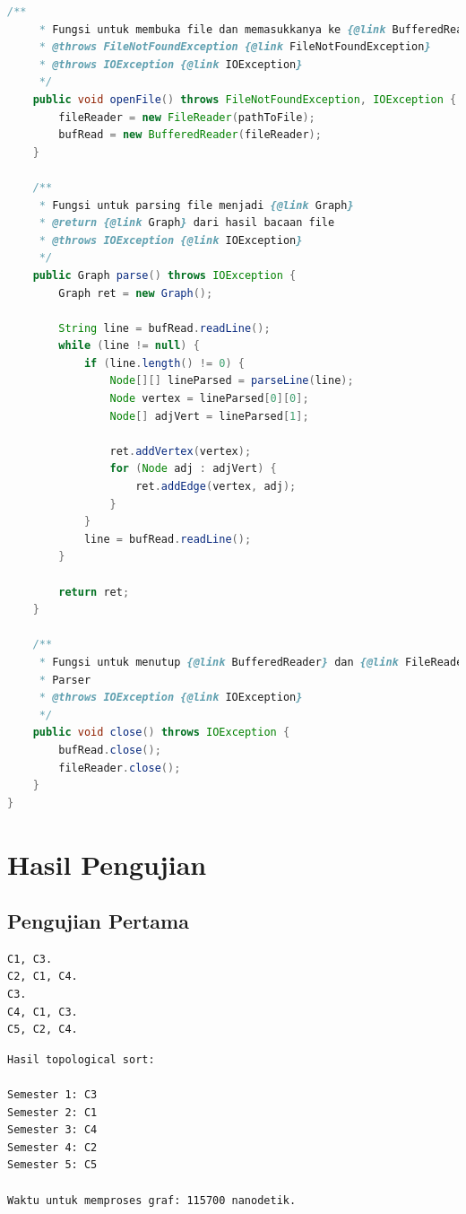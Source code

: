 \documentclass{article}
\begin{document}
\begin{lstlisting}[caption = lib/Parser.java, language = java]
    /**
     * Fungsi untuk membuka file dan memasukkanya ke {@link BufferedReader}
     * @throws FileNotFoundException {@link FileNotFoundException}
     * @throws IOException {@link IOException}
     */
    public void openFile() throws FileNotFoundException, IOException {
        fileReader = new FileReader(pathToFile);
        bufRead = new BufferedReader(fileReader);
    }

    /**
     * Fungsi untuk parsing file menjadi {@link Graph}
     * @return {@link Graph} dari hasil bacaan file
     * @throws IOException {@link IOException}
     */
    public Graph parse() throws IOException {
        Graph ret = new Graph();

        String line = bufRead.readLine();
        while (line != null) {
            if (line.length() != 0) {
                Node[][] lineParsed = parseLine(line);
                Node vertex = lineParsed[0][0];
                Node[] adjVert = lineParsed[1];

                ret.addVertex(vertex);
                for (Node adj : adjVert) {
                    ret.addEdge(vertex, adj);
                }
            }
            line = bufRead.readLine();
        }

        return ret;
    }

    /**
     * Fungsi untuk menutup {@link BufferedReader} dan {@link FileReader} pada
     * Parser
     * @throws IOException {@link IOException}
     */
    public void close() throws IOException {
        bufRead.close();
        fileReader.close();
    }
}
\end{lstlisting}

\section{Hasil Pengujian}
\subsection{Pengujian Pertama}
\begin{lstlisting}[caption = \textit{input}]
C1, C3.
C2, C1, C4.
C3.
C4, C1, C3.
C5, C2, C4.
\end{lstlisting}
\begin{lstlisting}[caption = \textit{output}]
Hasil topological sort:

Semester 1: C3
Semester 2: C1
Semester 3: C4
Semester 4: C2
Semester 5: C5

Waktu untuk memproses graf: 115700 nanodetik.
\end{lstlisting}
\end{document}
